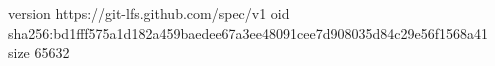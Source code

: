 version https://git-lfs.github.com/spec/v1
oid sha256:bd1fff575a1d182a459baedee67a3ee48091cee7d908035d84c29e56f1568a41
size 65632
